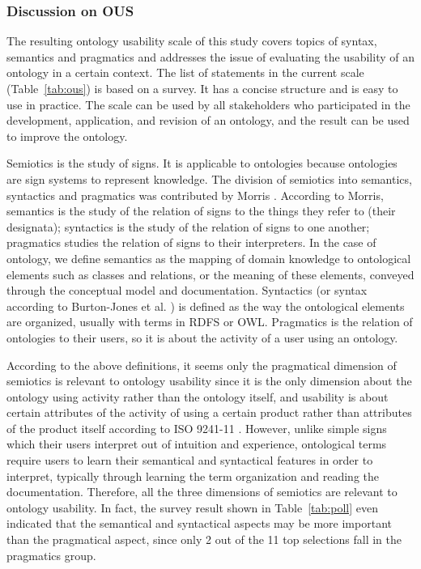 \subsubsection{Discussion on OUS}
The resulting ontology usability scale of this study covers topics of syntax, semantics and pragmatics and addresses the issue of evaluating the usability of an ontology in a certain context. The list of statements in the current scale (Table~\ref{tab:ous}) is based on a survey. It has a concise structure and is easy to use in practice. The scale can be used by all stakeholders who participated in the development, application, and revision of an ontology, and the result can be used to improve the ontology.

Semiotics is the study of signs. It is applicable to ontologies because ontologies are sign systems to represent knowledge. The division of semiotics into semantics, syntactics and pragmatics was contributed by Morris \cite{morris1938foundations}. According to Morris, semantics is the study of the relation of signs to the things they refer to (their designata); syntactics is the study of the relation of signs to one another; pragmatics studies the relation of signs to their interpreters. In the case of ontology, we define semantics as the mapping of domain knowledge to ontological elements such as classes and relations, or the meaning of these elements, conveyed through the conceptual model and documentation. Syntactics (or syntax according to Burton-Jones et al. \cite{burton2005semiotic}) is defined as the way the ontological elements are organized, usually with terms in RDFS or OWL. Pragmatics is the relation of ontologies to their users, so it is about the activity of a user using an ontology.

According to the above definitions, it seems only the pragmatical dimension of semiotics is relevant to ontology usability since it is the only dimension about the ontology using activity rather than the ontology itself, and usability is about certain attributes of the activity of using a certain product rather than attributes of the product itself according to ISO 9241-11 \cite{iso19989241}. However, unlike simple signs which their users interpret out of intuition and experience, ontological terms require users to learn their semantical and syntactical features in order to interpret, typically through learning the term organization and reading the documentation. Therefore, all the three dimensions of semiotics are relevant to ontology usability. In fact, the survey result shown in Table~\ref{tab:poll} even indicated that the semantical and syntactical aspects may be more important than the pragmatical aspect, since only 2 out of the 11 top selections fall in the pragmatics group.

